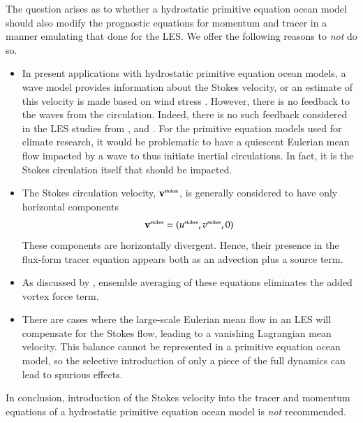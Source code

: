 The question arises as to whether a hydrostatic primitive equation
ocean model should also modify the prognostic equations for momentum
and tracer in a manner emulating that done for the LES.  We offer the
following reasons to {\it not} do so.
\begin{itemize}

\item In present applications with hydrostatic primitive equation
  ocean models, a wave model provides information about the Stokes
  velocity, or an estimate of this velocity is made based on wind
  stress \citep{Li_Garrett1993}.  However, there is no feedback to the
  waves from the circulation.  Indeed, there is no such feedback
  considered in the LES studies from
  \cite{McWilliamsSullivanMoeng1997}, \cite{McWilliamsSullivan2001}
  and \cite{SullivanMcWilliams07}.  For the primitive equation models
  used for climate research, it would be problematic to have a
  quiescent Eulerian mean flow impacted by a wave to thus initiate
  inertial circulations.  In fact, it is the Stokes circulation itself
  that should be impacted.  

\item The Stokes circulation velocity, ${\bf v}^{\mbox{\tiny stokes}}$,
  is generally considered to have only horizontal components
\begin{equation}
  {\bf v}^{\mbox{\tiny stokes}}  =(u^{\mbox{\tiny stokes}}, v^{\mbox{\tiny stokes}},0)
\end{equation}
These components are horizontally divergent. Hence, their presence in
the flux-form tracer equation appears both as an advection plus a
source term.

\item As discussed by \cite{Rascle_etal2004}, ensemble averaging of
  these equations eliminates the added vortex force term.   

\item There are cases where the large-scale Eulerian mean flow in an
  LES will compensate for the Stokes flow, leading to a vanishing
  Lagrangian mean velocity.  This balance cannot be represented in a
  primitive equation ocean model, so the selective introduction of
  only a piece of the full dynamics can lead to spurious effects.

\end{itemize}
In conclusion, introduction of the Stokes velocity into the tracer and
momentum equations of a hydrostatic primitive equation ocean model is
{\it not} recommended.


